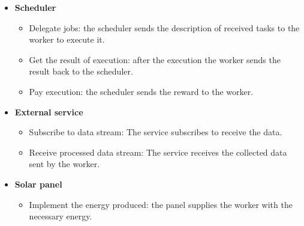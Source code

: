         \begin{itemize}
            \item \textbf{Scheduler}
                \begin{itemize}
                    \item Delegate jobs: the scheduler sends the description of received tasks to the worker
                    to execute it.
                    \item Get the result of execution: after the execution the worker sends the result back
                    to the scheduler.
                    \item Pay execution: the scheduler sends the reward to the worker.
                \end{itemize}
            
            \item \textbf{External service}
                \begin{itemize}
                    \item Subscribe to data stream: The service subscribes to receive the data.
                    \item Receive processed data stream: The service receives the collected data sent by the
                    worker.
                \end{itemize}
            
            \item \textbf{Solar panel}
                \begin{itemize}
                    \item Implement the energy produced: the panel supplies the worker with the necessary energy.
                \end{itemize}
        \end{itemize}


